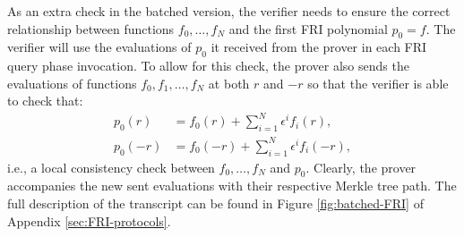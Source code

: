 As an extra check in the batched version, the verifier needs to ensure the correct relationship between functions $f_0,\dots,f_N$ and the first FRI polynomial $p_0 = f$. The verifier will use the evaluations of $p_0$ it received from the prover in each FRI query phase invocation. To allow for this check, the prover also sends the evaluations of functions $f_0,f_1,\dots,f_N$ at both $r$ and $-r$ so that the verifier is able to check that:
\begin{align*}
  p_0(r) &= f_0(r) + \sum_{i=1}^N \epsilon^i f_i(r), \\
  p_0(-r) &= f_0(-r) + \sum_{i=1}^N \epsilon^i f_i(-r),
\end{align*}
i.e., a local consistency check between $f_0,\dots,f_N$ and $p_0$. Clearly, the prover accompanies the new sent evaluations with their respective Merkle tree path. The full description of the transcript can be found in Figure \ref{fig:batched-FRI} of Appendix \ref{sec:FRI-protocols}.

